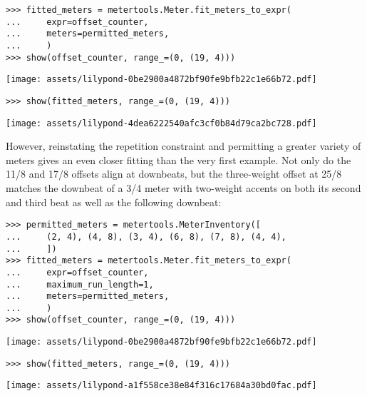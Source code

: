 \begin{abjadbookoutput}
\begin{singlespacing}
\vspace{-0.5\baselineskip}
\begin{verbatim}
>>> fitted_meters = metertools.Meter.fit_meters_to_expr(
...     expr=offset_counter,
...     meters=permitted_meters,
...     )
>>> show(offset_counter, range_=(0, (19, 4)))
\end{verbatim}
\noindent\texttt{[image: assets/lilypond-0be2900a4872bf90fe9bfb22c1e66b72.pdf]}
\begin{verbatim}
>>> show(fitted_meters, range_=(0, (19, 4)))
\end{verbatim}
\noindent\texttt{[image: assets/lilypond-4dea6222540afc3cf0b84d79ca2bc728.pdf]}
\end{singlespacing}
\end{abjadbookoutput}

\noindent However, reinstating the repetition constraint and permitting a
greater variety of meters gives an even closer fitting than the very first
example. Not only do the 11/8 and 17/8 offsets align at downbeats, but the
three-weight offset at 25/8 matches the downbeat of a 3/4 meter with two-weight
accents on both its second and third beat as well as the following downbeat:

\begin{comment}
<abjad>
permitted_meters = metertools.MeterInventory([
    (2, 4), (4, 8), (3, 4), (6, 8), (7, 8), (4, 4),
    ])
fitted_meters = metertools.Meter.fit_meters_to_expr(
    expr=offset_counter,
    maximum_run_length=1,
    meters=permitted_meters,
    )
show(offset_counter, range_=(0, (19, 4)))
show(fitted_meters, range_=(0, (19, 4)))
</abjad>
\end{comment}

\begin{abjadbookoutput}
\begin{singlespacing}
\vspace{-0.5\baselineskip}
\begin{verbatim}
>>> permitted_meters = metertools.MeterInventory([
...     (2, 4), (4, 8), (3, 4), (6, 8), (7, 8), (4, 4),
...     ])
>>> fitted_meters = metertools.Meter.fit_meters_to_expr(
...     expr=offset_counter,
...     maximum_run_length=1,
...     meters=permitted_meters,
...     )
>>> show(offset_counter, range_=(0, (19, 4)))
\end{verbatim}
\noindent\texttt{[image: assets/lilypond-0be2900a4872bf90fe9bfb22c1e66b72.pdf]}
\begin{verbatim}
>>> show(fitted_meters, range_=(0, (19, 4)))
\end{verbatim}
\noindent\texttt{[image: assets/lilypond-a1f558ce38e84f316c17684a30bd0fac.pdf]}
\end{singlespacing}
\end{abjadbookoutput}

